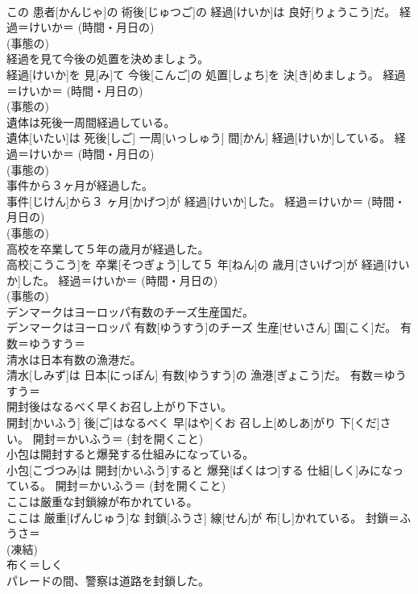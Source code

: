 \documentclass[8pt]{extreport}
\begin{document}
\begin{CJK}{UTF8}{min}
{\\	この 患者[かんじゃ]の 術後[じゅつご]の 経過[けいか]は 良好[りょうこう]だ。	経過＝けいか＝ (時間・月日の) 
\\	(事態の) 
\\	経過を見て今後の処置を決めましょう。	
\\	経過[けいか]を 見[み]て 今後[こんご]の 処置[しょち]を 決[き]めましょう。	経過＝けいか＝ (時間・月日の) 
\\	(事態の) 
\\	遺体は死後一周間経過している。	
\\	遺体[いたい]は 死後[しご] 一周[いっしゅう] 間[かん] 経過[けいか]している。	経過＝けいか＝ (時間・月日の) 
\\	(事態の) 
\\	事件から３ヶ月が経過した。	
\\	事件[じけん]から３ ヶ月[かげつ]が 経過[けいか]した。	経過＝けいか＝ (時間・月日の) 
\\	(事態の) 
\\	高校を卒業して５年の歳月が経過した。	
\\	高校[こうこう]を 卒業[そつぎょう]して５ 年[ねん]の 歳月[さいげつ]が 経過[けいか]した。	経過＝けいか＝ (時間・月日の) 
\\	(事態の) 
\\	デンマークはヨーロッパ有数のチーズ生産国だ。	
\\	デンマークはヨーロッパ 有数[ゆうすう]のチーズ 生産[せいさん] 国[こく]だ。	有数＝ゆうすう＝ 
\\	清水は日本有数の漁港だ。	
\\	清水[しみず]は 日本[にっぽん] 有数[ゆうすう]の 漁港[ぎょこう]だ。	有数＝ゆうすう＝ 
\\	開封後はなるべく早くお召し上がり下さい。	
\\	開封[かいふう] 後[ご]はなるべく 早[はや]くお 召し上[めしあ]がり 下[くだ]さい。	開封＝かいふう＝ (封を開くこと) 
\\	小包は開封すると爆発する仕組みになっている。	
\\	小包[こづつみ]は 開封[かいふう]すると 爆発[ばくはつ]する 仕組[しく]みになっている。	開封＝かいふう＝ (封を開くこと) 
\\	ここは厳重な封鎖線が布かれている。	
\\	ここは 厳重[げんじゅう]な 封鎖[ふうさ] 線[せん]が 布[し]かれている。	封鎖＝ふうさ＝ 
\\	(凍結) 
\\	布く＝しく
\\	パレードの間、警察は道路を封鎖した。	
}
\end{CJK}
\end{document}
